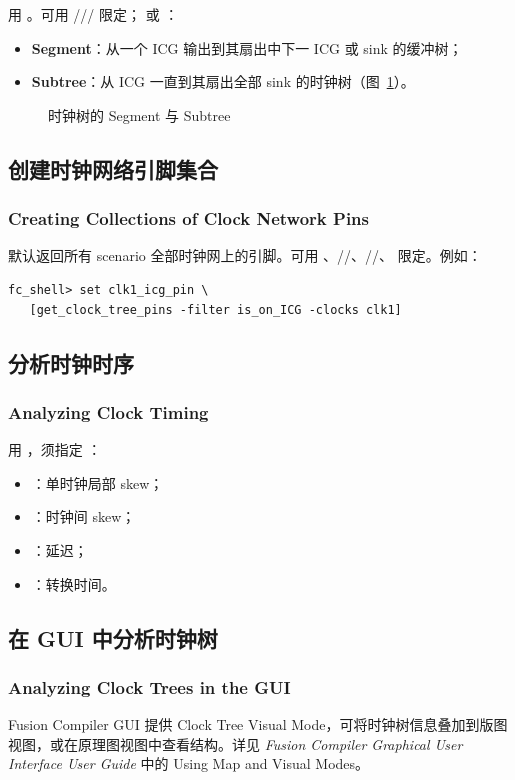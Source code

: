 用 。可用 /// 限定； 或 ：
\begin{itemize}
  \item \textbf{Segment}：从一个 ICG 输出到其扇出中下一 ICG 或 sink 的缓冲树；
  \item \textbf{Subtree}：从 ICG 一直到其扇出全部 sink 的时钟树（图~\ref{fig:seg-sub}）。
\end{itemize}

\begin{figure}[htbp]
\centering
{}
\caption{时钟树的 Segment 与 Subtree}
\label{fig:seg-sub}
\end{figure}

\subsection{创建时钟网络引脚集合}
\subsubsection*{Creating Collections of Clock Network Pins}

 默认返回所有 scenario 全部时钟网上的引脚。可用 、//、//、 限定。例如：
\begin{lstlisting}
fc_shell> set clk1_icg_pin \
   [get_clock_tree_pins -filter is_on_ICG -clocks clk1]
\end{lstlisting}

\subsection{分析时钟时序}
\subsubsection*{Analyzing Clock Timing}

用 ，须指定 ：
\begin{itemize}
  \item {}：单时钟局部 skew；
  \item {}：时钟间 skew；
  \item {}：延迟；
  \item {}：转换时间。
\end{itemize}

\subsection{在 GUI 中分析时钟树}
\subsubsection*{Analyzing Clock Trees in the GUI}

Fusion Compiler GUI 提供 Clock Tree Visual Mode，可将时钟树信息叠加到版图视图，或在原理图视图中查看结构。详见 \textit{Fusion Compiler Graphical User Interface User Guide} 中的 Using Map and Visual Modes。
